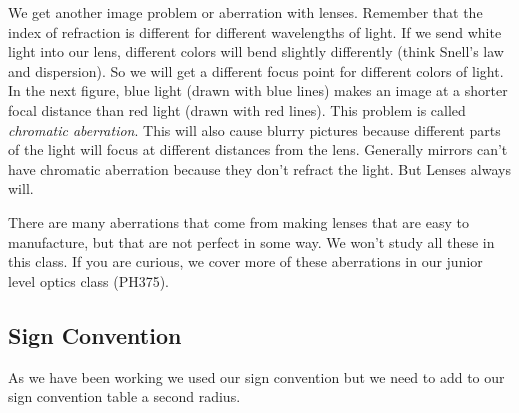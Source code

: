 \documentclass{article}
\begin{document}
We get another image problem or aberration with lenses. Remember that the
index of refraction is different for different wavelengths of light. If we
send white light into our lens, different colors will bend slightly
differently (think Snell's law and dispersion). So we will get a different
focus point for different colors of light. In the next figure, blue light
(drawn with blue lines) makes an image at a shorter focal distance than red
light (drawn with red lines). This problem is called \emph{chromatic
aberration}. This will also cause blurry
pictures because different parts of the light will focus at different
distances from the lens. Generally mirrors can't have chromatic aberration
because they don't refract the light. But Lenses always will.

There are many aberrations that come from making lenses that are easy to
manufacture, but that are not perfect in some way. We won't study all these
in this class. If you are curious, we cover more of these aberrations in our
junior level optics class (PH375).

\subsection{Sign Convention}

As we have been working we used our sign convention but we need to add to
our sign convention table a second radius.
\end{document}
